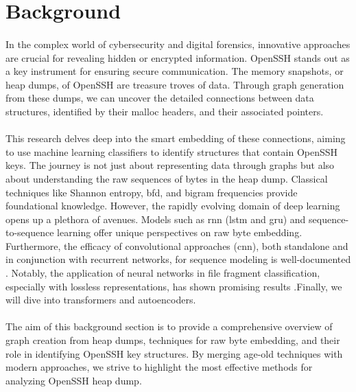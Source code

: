\section{Background}\label{chap:background}


\paragraph*{}In the complex world of cybersecurity and digital forensics, innovative approaches are crucial for revealing hidden or encrypted information. OpenSSH stands out as a key instrument for ensuring secure communication. The memory snapshots, or heap dumps, of OpenSSH are treasure troves of data. Through graph generation from these dumps, we can uncover the detailed connections between data structures, identified by their malloc headers, and their associated pointers.

\paragraph*{}This research delves deep into the smart embedding of these connections, aiming to use machine learning classifiers to identify structures that contain OpenSSH keys. The journey is not just about representing data through graphs but also about understanding the raw sequences of bytes in the heap dump. Classical techniques like Shannon entropy, \acrfull{bfd}, and bigram frequencies provide foundational knowledge. However, the rapidly evolving domain of deep learning opens up a plethora of avenues. Models such as \acrfull{rnn} \cite{lai_recurrent_2015} (\acrfull{lstm}\cite{hochreiter_long_1997} and \acrfull{gru}\cite{chung_empirical_2014}) and sequence-to-sequence learning \cite{sutskever_sequence_2014} offer unique perspectives on raw byte embedding. Furthermore, the efficacy of convolutional approaches (\acrshort{cnn}), both standalone\cite{lecun_gradient-based_1998} and in conjunction with recurrent networks, for sequence modeling is well-documented \cite{bai_empirical_2018}. Notably, the application of neural networks in file fragment classification, especially with lossless representations, has shown promising results \cite{hiester_file_2018}.Finally, we will dive into transformers and autoencoders.

\paragraph*{}The aim of this background section is to provide a comprehensive overview of graph creation from heap dumps, techniques for raw byte embedding, and their role in identifying OpenSSH key structures. By merging age-old techniques with modern approaches, we strive to highlight the most effective methods for analyzing OpenSSH heap dump.

